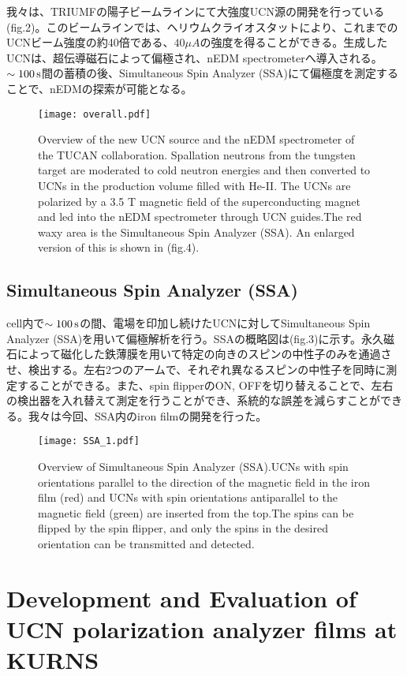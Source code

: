 \documentclass[onecolumn]{preport}
\begin{document}
我々は、TRIUMFの陽子ビームラインにて大強度UCN源の開発を行っている(fig.2)。このビームラインでは、ヘリウムクライオスタットにより、これまでのUCNビーム強度の約40倍である、$40\mu A$の強度を得ることができる。生成したUCNは、超伝導磁石によって偏極され、nEDM spectrometerへ導入される。$\sim 100\,\rm s$間の蓄積の後、Simultaneous Spin Analyzer (SSA)にて偏極度を測定することで、nEDMの探索が可能となる。

\begin{figure}[tbh]
 \centering
 \texttt{[image: overall.pdf]}
 \caption{ Overview of the new UCN source and the nEDM spectrometer of the TUCAN collaboration. Spallation neutrons from the tungsten target are moderated to cold neutron energies and then converted to UCNs in the production volume filled with He-II. The UCNs are polarized by a 3.5 T magnetic field of the superconducting magnet and led into the nEDM spectrometer through UCN guides.The red waxy area is the Simultaneous Spin Analyzer (SSA). An enlarged version of this is shown in (fig.4).}
\end{figure}


\subsection{Simultaneous Spin Analyzer (SSA)}
cell内で$\sim 100\,\rm s$の間、電場を印加し続けたUCNに対してSimultaneous Spin Analyzer (SSA)を用いて偏極解析を行う。SSAの概略図は(fig.3)に示す。永久磁石によって磁化した鉄薄膜を用いて特定の向きのスピンの中性子のみを通過させ、検出する。左右2つのアームで、それぞれ異なるスピンの中性子を同時に測定することができる。また、spin flipperのON, OFFを切り替えることで、左右の検出器を入れ替えて測定を行うことができ、系統的な誤差を減らすことができる。我々は今回、SSA内のiron filmの開発を行った。


\begin{figure}[tbh]
 \centering
 \texttt{[image: SSA\_1.pdf]}
 \caption{Overview of Simultaneous Spin Analyzer (SSA).UCNs with spin orientations parallel to the direction of the magnetic field in the iron film (red) and UCNs with spin orientations antiparallel to the magnetic field (green) are inserted from the top.The spins can be flipped by the spin flipper, and only the spins in the desired orientation can be transmitted and detected.}
\end{figure}

\section{Development and Evaluation of UCN polarization analyzer films at KURNS}
\end{document}
